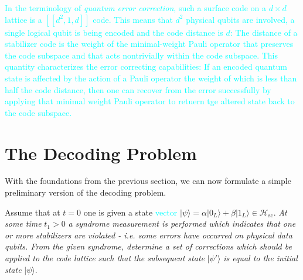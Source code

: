 \documentclass[twocolumn,preprintnumbers,amsmath,amssymb,notitlepage,nofootinbib,longbibliography,superscriptaddress,aps,pra,10pt]{revtex4-1}
\newcommand{\je}[1]{\textcolor{cyan}{#1}}
\begin{document}
	 \je{In the terminology of \emph{quantum error correction}, such a surface code on a $d\times d$ lattice is a 
	$[[d^2,1,d]]$ code. This means that $d^2$ physical qubits are involved, a single logical qubit is being encoded and the code distance is
	$d$: The distance of a stabilizer code is the weight of the minimal-weight Pauli operator that preserves the code subspace and that 
	acts nontrivially within the code subspace. This quantity characterizes the error correcting capabilities: If an encoded
	quantum state is affected by the action of a Pauli operator the weight of which is less than half the code distance, 
	then one can recover from the error successfully by applying that minimal weight Pauli operator to retuern tge 
	altered state back to the code subspace.}


\section{The Decoding Problem}\label{s:the_decoding_problem}

	With the foundations from the previous section, we can now formulate a simple preliminary version of the decoding problem.

	\begin{problem}[\je{Decoding problem}]Assume that at $t=0$ one is given a state \je{vector} $|\psi\rangle = \alpha |0_L\rangle + \beta |1_L\rangle \in \mathcal{H}_{\mathrm{sc}}.$ \textit{At some time }$t_1>0$ \textit{a syndrome measurement is performed which indicates that one or more stabilizers are violated - i.e. some errors have occurred on physical data qubits. From the given syndrome, determine a set of corrections which should be applied to the code lattice such that the subsequent state} $|\psi'\rangle$ \textit{is equal to the initial state} $|\psi\rangle.$ 
	\end{problem}
	
\end{document}
